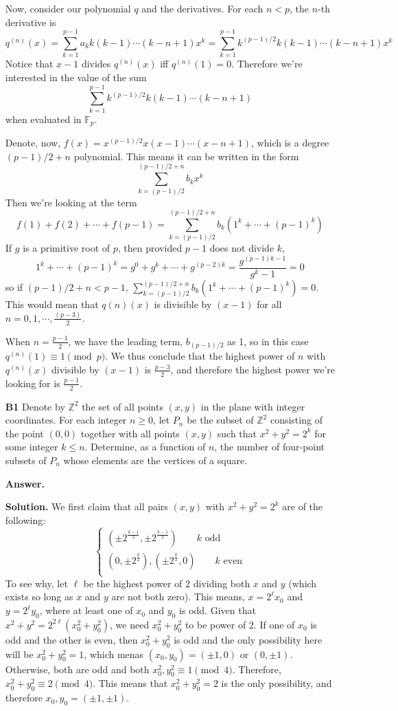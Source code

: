 \documentclass[11pt,a4paper]{article}
\newcommand{\bbF}{\mathbb F}
\newcommand{\<}{\langle}
\renewcommand{\>}{\rangle}
\newcommand{\dsum}{\displaystyle\sum}
\begin{document}
\begin{enumerate}
	Now, consider our polynomial $q$ and the derivatives. For each $n<p$, the $n$-th derivative is 
	\[
	q^{(n)}(x)=\dsum_{k=1}^{p-1}a_kk(k-1)\cdots(k-n+1)x^k
	=\dsum_{k=1}^{p-1}k^{(p-1)/2}k(k-1)\cdots(k-n+1)x^k
	\]
	Notice that $x-1$ divides $q^{(n)}(x)$ iff $q^{(n)}(1)=0$. Therefore we're interested in the value of the sum 
	\[
	\dsum_{k=1}^{p-1}k^{(p-1)/2}k(k-1)\cdots(k-n+1)
	\]
	when evaluated in $\bbF_p$. 
	
	Denote, now, $f(x)=x^{(p-1)/2}x(x-1)\cdots(x-n+1)$, which is a degree $(p-1)/2+n$ polynomial. This means it can be written in the form 
	\[
	\dsum_{k=(p-1)/2}^{(p-1)/2+n} b_kx^k
	\]
	Then we're looking at the term 
	\[
	f(1)+f(2)+\cdots + f(p-1)= \dsum_{k=(p-1)/2}^{(p-1)/2+n} b_k(1^k+\cdots + (p-1)^k)
	\]
	If $g$ is a primitive root of $p$, then provided $p-1$ does not divide $k$, 
	\[
	1^k+\cdots + (p-1)^k
	=g^0+g^k+\cdots + g^{(p-2)k}
	=\frac{g^{(p-1)k-1}}{g^k-1}
	=0
	\]
	so if $(p-1)/2+n<p-1$, $\dsum_{k=(p-1)/2}^{(p-1)/2+n} b_k(1^k+\cdots + (p-1)^k)=0$. 
	This would mean that $q{(n)}(x)$ is divisible by $(x-1)$ for all $n=0, 1, \cdots, \frac{(p-3)}{2}$. 
	
	When $n=\frac{p-1}{2}$, we have the leading term, $b_{(p-1)/2}$ as 1, so in this case $q^{(n)}(1)\equiv 1\pmod{p}$. We thus conclude that the highest power of $n$ with $q^{(n)}(x)$ divisible by $(x-1)$ is $\frac{p-3}{2}$, and therefore the highest power we're looking for is $\frac{p-1}{2}$. 
	
	\item [\textbf{B1}] Denote by $\mathbb Z^2$ the set of all points $(x,y)$ in the plane with integer coordinates.  For each integer $n\geq 0$, let $P_n$ be the subset of $\mathbb Z^2$ consisting of the point $(0,0)$ together with all points $(x,y)$ such that $x^2+y^2=2^k$ for some integer $k\leq n$.  Determine, as a function of $n$, the number of four-point subsets of $P_n$ whose elements are the vertices of a square.
	
	\textbf{Answer.} 
	
	\textbf{Solution.} We first claim that all pairs $(x, y)$ with $x^2+y^2=2^k$ are of the following: 
	\[
	\begin{cases}
		(\pm 2^{\frac{k-1}{2}}, \pm 2^{\frac{k-1}{2}})\qquad k\text{ odd}\\
		(0, \pm 2^{\frac k2}), (\pm 2^{\frac k2}, 0)\qquad k\text{ even}\\
	\end{cases}
	\]
	To see why, let $\ell$ be the highest power of 2 dividing both $x$ and $y$ (which exists so long as $x$ and $y$ are not both zero). 
	This means, $x=2^{\ell}x_0$ and $y=2^{\ell}y_0$, where at least one of $x_0$ and $y_0$ is odd. 
	Given that $x^2+y^2=2^{2\ell}(x_0^2+y_0^2)$, we need $x_0^2+y_0^2$ to be power of 2. 
	If one of $x_0$ is odd and the other is even, then $x_0^2+y_0^2$ is odd and the only possibility here will be $x_0^2+y_0^2=1$, which menas $(x_0, y_0)=(\pm 1, 0)$ or $(0, \pm 1)$. 
	Otherwise, both are odd and both $x_0^2, y_0^2\equiv 1\pmod{4}$. 
	Therefore, $x_0^2+y_0^2\equiv 2\pmod{4}$. This means that $x_0^2+y_0^2=2$ is the only possibility, and therefore $x_0, y_0=(\pm 1, \pm 1)$. 
	

\end{enumerate}
\end{document}
